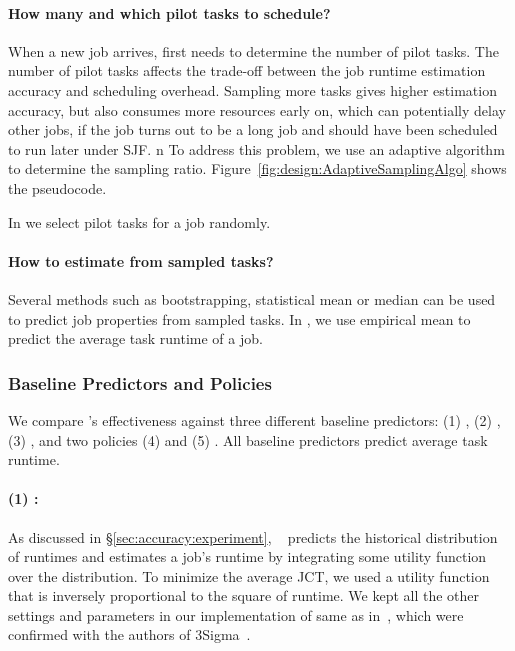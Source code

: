 \paragraph{How many and which pilot tasks to schedule?}
When a new job arrives, \name first needs to determine the number of
pilot tasks.  The number of pilot tasks affects the trade-off between
the job runtime estimation accuracy and scheduling overhead.  Sampling
more tasks gives higher estimation accuracy, 
but also consumes more resources early on, which can potentially delay other
jobs, if the job turns out to be a long job and should have been scheduled to
run later under SJF.
n%
{To address this problem, we use an adaptive algorithm to determine the
sampling ratio. Figure~\ref{fig:design:AdaptiveSamplingAlgo} shows the pseudocode.}


In \slearn we select pilot tasks for a job randomly.


\paragraph{How to estimate from sampled tasks?}  Several methods such
as bootstrapping, statistical mean or median can be used to predict job
properties from sampled tasks.  In \gs, we use empirical mean to
predict the average task runtime of a job.  

\subsubsection{Baseline Predictors and Policies}
\label{sec:design:baselines}

We compare \slearn's effectiveness against three different baseline predictors:
(1) \primarybasepredict,  (2) \pointestimator , (3) \oracle , and two policies (4) \las
and (5) \fifo. All baseline  predictors predict average task runtime.

\paragraph{(1) \primarybasepredict: } 
As discussed in \S\ref{sec:accuracy:experiment},
\primarybasepredict~\cite{3Sigma} 
predicts the historical distribution of runtimes 
and estimates a job's runtime by integrating some utility function over the distribution.
To minimize the average JCT, we used a utility function that is inversely
proportional to the square of runtime.  We kept all the other settings
and parameters in our implementation of \primarybasepredict same 
as in~\cite{3Sigma}, which were confirmed with the authors of
3Sigma~\cite{personalCommunication:JunWoo}.

